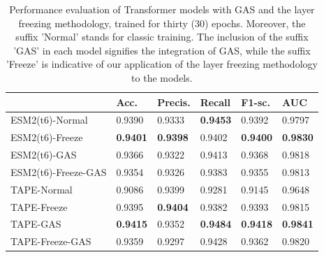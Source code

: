 \begin{table}[h]
	\centering
	\caption{Performance evaluation of Transformer models with GAS and the layer freezing methodology, trained for thirty (30) epochs. Moreover, the suffix 'Normal' stands for classic training. The inclusion of the suffix 'GAS' in each model signifies the integration of GAS, while the suffix 'Freeze' is indicative of our application of the layer freezing methodology to the models.}
	\label{tab:comparison}
	\scriptsize
	\begin{tabular}{llllll} \hline
		\textbf{}            & \textbf{Acc.} & \textbf{Precis.} & \textbf{Recall} & \textbf{F1-sc.} & \textbf{AUC}      \\ \hline
		ESM2(t6)-Normal             & 0.9390            & 0.9333             & \textbf{0.9453} & 0.9392            & 0.9797                    \\
		
		ESM2(t6)-Freeze      & \textbf{0.9401}   & \textbf{0.9398}    & 0.9402          & \textbf{0.9400}   & \textbf{0.9830}          \\
		ESM2(t6)-GAS         & 0.9366            & 0.9322             & 0.9413          & 0.9368            & 0.9818                           \\
		ESM2(t6)-Freeze-GAS  & 0.9354            & 0.9326             & 0.9383          & 0.9355            & 0.9813                             \\ \hline
		
		TAPE-Normal        & 0.9086                 & 0.9399                  & 0.9281               & 0.9145                 & 0.9648                                 \\
		TAPE-Freeze          & 0.9395            & \textbf{0.9404}    & 0.9382          & 0.9393            & 0.9815                           \\
		TAPE-GAS             & \textbf{0.9415}   & 0.9352             & \textbf{0.9484} & \textbf{0.9418}   & \textbf{0.9841}            \\
		TAPE-Freeze-GAS      & 0.9359            & 0.9297             & 0.9428          & 0.9362            & 0.9820                    \\ \hline    
	\end{tabular}
\end{table}



